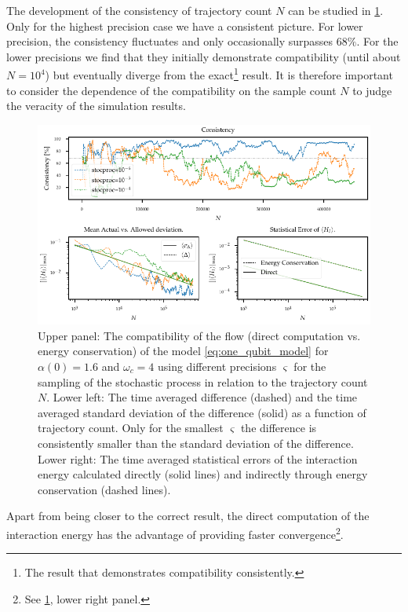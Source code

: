 The development of the consistency of trajectory count \(N\) can be
studied in \cref{fig:stocproc_consistency_dev}. Only for the highest
precision case we have a consistent picture. For lower precision, the
consistency fluctuates and only occasionally surpasses \(68\%\). For
the lower precisions we find that they initially demonstrate
compatibility (until about \(N=10^4\)) but eventually diverge from the
exact\footnote{The result that demonstrates compatibility
  consistently.} result. It is therefore important to consider the
dependence of the compatibility on the sample count \(N\) to judge the
veracity of the simulation results.
\begin{figure}[p]
  \centering
  \includegraphics{figs/one_bath_syst/stocproc_systematics_consistency}
  \caption{\label{fig:stocproc_consistency_dev} Upper panel: The
    compatibility of the flow (direct computation vs. energy
    conservation) of the model \cref{eq:one_qubit_model} for
    \(α(0)=1.6\) and \(ω_c=4\) using different precisions
    \(\varsigma\) for the sampling of the stochastic process in
    relation to the trajectory count \(N\). Lower left: The time
    averaged difference (dashed) and the time averaged standard
    deviation of the difference (solid) as a function of trajectory
    count. Only for the smallest \(\varsigma\) the difference is
    consistently smaller than the standard deviation of the
    difference. Lower right: The time averaged statistical errors of the interaction
    energy calculated directly (solid lines) and indirectly through
    energy conservation (dashed lines).}
\end{figure}

Apart from being closer to the correct result, the direct computation
of the interaction energy has the advantage of providing faster
convergence\footnote{See \cref{fig:stocproc_consistency_dev}, lower right
  panel.}.

